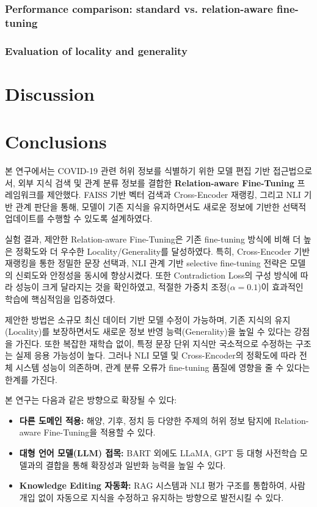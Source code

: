 \documentclass[a4paper,fleqn]{cas-sc}
\begin{document}
\subsubsection{Performance comparison: standard vs. relation-aware fine-tuning}

\subsubsection{Evaluation of locality and generality}

\section{Discussion}

\section{Conclusions}

본 연구에서는 COVID-19 관련 허위 정보를 식별하기 위한 모델 편집 기반 접근법으로서, 외부 지식 검색 및 관계 분류 정보를 결합한 \textbf{Relation-aware Fine-Tuning} 프레임워크를 제안했다.  
FAISS 기반 벡터 검색과 Cross-Encoder 재랭킹, 그리고 NLI 기반 관계 판단을 통해, 모델이 기존 지식을 유지하면서도 새로운 정보에 기반한 선택적 업데이트를 수행할 수 있도록 설계하였다.
  
실험 결과, 제안한 Relation-aware Fine-Tuning은 기존 fine-tuning 방식에 비해 더 높은 정확도와 더 우수한 Locality/Generality를 달성하였다.  
특히, Cross-Encoder 기반 재랭킹을 통한 정밀한 문장 선택과, NLI 관계 기반 selective fine-tuning 전략은 모델의 신뢰도와 안정성을 동시에 향상시켰다.  
또한 Contradiction Loss의 구성 방식에 따라 성능이 크게 달라지는 것을 확인하였고, 적절한 가중치 조정(\(\alpha = 0.1\))이 효과적인 학습에 핵심적임을 입증하였다.
  
제안한 방법은 소규모 최신 데이터 기반 모델 수정이 가능하며, 기존 지식의 유지(Locality)를 보장하면서도 새로운 정보 반영 능력(Generality)을 높일 수 있다는 강점을 가진다.  
또한 복잡한 재학습 없이, 특정 문장 단위 지식만 국소적으로 수정하는 구조는 실제 응용 가능성이 높다.  
그러나 NLI 모델 및 Cross-Encoder의 정확도에 따라 전체 시스템 성능이 의존하며, 관계 분류 오류가 fine-tuning 품질에 영향을 줄 수 있다는 한계를 가진다.

  
본 연구는 다음과 같은 방향으로 확장될 수 있다:
\begin{itemize}
    \item \textbf{다른 도메인 적용:} 해양, 기후, 정치 등 다양한 주제의 허위 정보 탐지에 Relation-aware Fine-Tuning을 적용할 수 있다.
    \item \textbf{대형 언어 모델(LLM) 접목:} BART 외에도 LLaMA, GPT 등 대형 사전학습 모델과의 결합을 통해 확장성과 일반화 능력을 높일 수 있다.
    \item \textbf{Knowledge Editing 자동화:} RAG 시스템과 NLI 평가 구조를 통합하여, 사람 개입 없이 자동으로 지식을 수정하고 유지하는 방향으로 발전시킬 수 있다.
\end{itemize}
\clearpage

\printcredits


%
%
\end{document}
